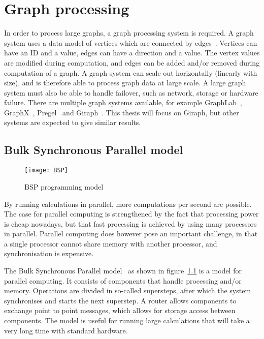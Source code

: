 \chapter{Graph processing}
\label{chp:graph}

In order to process large graphs, a graph processing system is required.
A graph system uses a data model of vertices which are connected by edges~\cite{sakr2013processing}.
Vertices can have an ID and a value, edges can have a direction and a value.
The vertex values are modified during computation, and edges can be added and/or removed during computation of a graph.
A graph system can scale out horizontally (linearly with size), and is therefore able to process graph data at large scale.
A large graph system must also be able to handle failover, such as network, storage or hardware failure.
There are multiple graph systems available,
 for example GraphLab~\cite{low2010graphlab}, 
 GraphX~\cite{xin2013graphx}, 
 Pregel~\cite{Malewicz:2010:PSL:1807167.1807184} 
 and Giraph~\cite{avery2011giraph,ching2013scaling}.
This thesis will focus on Giraph,
 but other systems are expected to give similar results.

\section{Bulk Synchronous Parallel model}
\label{sec:bsp}

\begin{figure}[h!]
	\caption{BSP programming model~\cite{sakr2013processing}}
	\label{fig:BSP}
	\centering
		\texttt{[image: BSP]}
\end{figure}

By running calculations in parallel, more computations per second are possible.
The case for parallel computing is strengthened by the fact that processing power is cheap nowadays,
 but that fast processing is achieved by using many processors in parallel.
Parallel computing does however pose an important challenge,
 in that a single processor cannot share memory with another processor, and synchronisation is expensive.

The Bulk Synchronous Parallel model~\cite{Valiant:1990:BMP:79173.79181} as shown in figure~\ref{fig:BSP} is a model for parallel computing.
It consists of components that handle processing and/or memory.
Operations are divided in so-called supersteps, after which the system synchronises and starts the next superstep.
A router allows components to exchange point to point messages,
 which allows for storage access between components.
The model is useful for running large calculations that will take a very long time with standard hardware.

